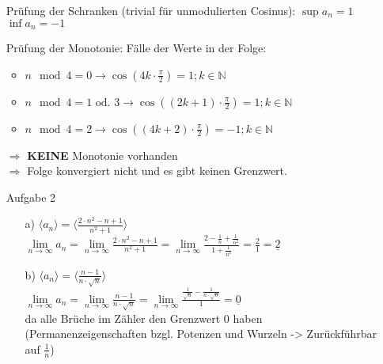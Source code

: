 \documentclass{scrreprt}
\begin{document}
\begin{enumerate}
{\begin{enumerate}
{                    Prüfung der Schranken (trivial für unmodulierten Cosinus):\newline
                    \textbullet $\sup a_n = 1$\newline
                    \textbullet $\inf a_n = -1$\newline

                    Prüfung der Monotonie:\newline
                    Fälle der Werte in der Folge:
                    \begin{itemize}
                        \item{$n\mod 4 = 0 \rightarrow \cos(4k\cdot \frac{\pi}{2}) = 1 ; k\in \mathbb{N} $}
                        \item{$n\mod 4 = 1 \text{ od. } 3 \rightarrow \cos((2k + 1)\cdot \frac{\pi}{2}) = 1 ; k\in \mathbb{N} $}
                        \item{$n\mod 4 = 2 \rightarrow \cos((4k + 2)\cdot \frac{\pi}{2}) = -1 ; k\in \mathbb{N} $}
                    \end{itemize}
                    $\Rightarrow$ \textbf{KEINE} Monotonie vorhanden\\
                    $\Rightarrow$ Folge konvergiert nicht und es gibt keinen Grenzwert.
                }
            \end{enumerate}
        }
        \newpage
        \item[Aufgabe 2] {
            \begin{enumerate}
                \item[a)]{
                    $\langle a_n\rangle = \langle \frac{2\cdot n^2 - n + 1}{n^2 +1}\rangle$\\
                    $\lim \limits_{n \to \infty} a_n =
                    \lim \limits_{n \to \infty} \frac{2\cdot n^2 - n + 1}{n^2 +1} =
                    \lim \limits_{n \to \infty} \frac{2 - \frac{1}{n} + \frac{1}{n^2}}{1+ \frac{1}{n^2}} =
                    \frac{2}{1} = \underline{2}$
                }
                \item[b)]{
                    $\langle a_n\rangle = \langle \frac{n-1}{n\cdot\sqrt{n}}\rangle$\\
                    $\lim \limits_{n \to \infty} a_n =
                    \lim \limits_{n \to \infty} \frac{n-1}{n\cdot\sqrt{n}} =
                    \lim \limits_{n \to \infty} \frac{\frac{1}{\sqrt{n}} - \frac{1}{n\cdot\sqrt{n}}}{1} =
                    \underline{0}$\\
                    da alle Brüche im Zähler den Grenzwert 0 haben (Permanenzeigenschaften bzgl. Potenzen und Wurzeln -> Zurückführbar auf $\frac{1}{n}$)
}
\end{enumerate}}
\end{enumerate}
\end{document}

